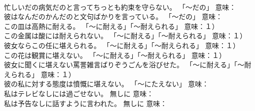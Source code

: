 \documentclass[8pt]{extreport}
\begin{document}
\begin{CJK}{UTF8}{min}
\\	忙しいだの病気だのと言ってちっとも約束を守らない。	「～だの」 意味：
\\	彼はなんだのかんだのと文句ばかりを言っている。	「～だの」 意味：
\\	この皿は高熱に耐える。	「～に耐える」「～耐えられる」 意味：１）
\\	この金属は酸には耐えられない。	「～に耐える」「～耐えられる」 意味：１）
\\	彼女ならこの任に堪えられる。	「～に耐える」「～耐えられる」 意味：１）
\\	この花は観賞に堪えない。	「～に耐える」「～耐えられる」 意味：１）
\\	彼女に聞くに堪えない罵詈雑言ばりぞうごんを浴びせた。	「～に耐える」「～耐えられる」 意味：１）
\\	彼の私に対する態度は憤慨に堪えない。	「～にたえない」 意味：
\\	私はテレビなしには過ごせない。	無しに 意味：
\\	私は予告なしに話すように言われた。	無しに 意味：
\end{CJK}
\end{document}
